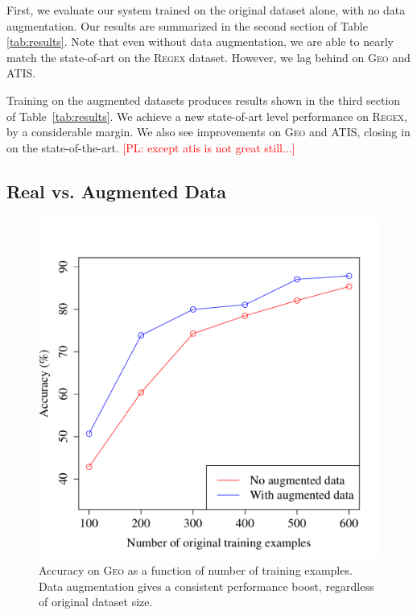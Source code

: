 \documentclass[11pt,letterpaper]{article}
\newcommand{\atis}{\textsc{ATIS}\xspace}
\newcommand{\regex}{\textsc{Regex}\xspace}
\newcommand{\geo}{\textsc{Geo}\xspace}
\newcommand\pl[1]{\textcolor{red}{[PL: #1]}}
\begin{document}
First, we evaluate our system trained on the original dataset alone,
with no data augmentation.
Our results are summarized in the second section of Table \ref{tab:results}.
Note that even without data augmentation, we are able to nearly
match the state-of-art on the \regex dataset.
However, we lag behind on \geo and \atis.

Training on the augmented datasets produces results shown in the
third section of Table~\ref{tab:results}.
We achieve a new state-of-art level performance
on \regex, by a considerable margin.  We also see
improvements on \geo and \atis,
closing in on the state-of-the-art.
\pl{except atis is not great still...}


\subsection{Real vs. Augmented Data}
\begin{figure}[t] 
\small
\begin{center} 
  \includegraphics[scale=0.4]{fig-geo-augment.pdf}
\end{center} 
\caption{Accuracy on \geo as a function of number of training examples.
  Data augmentation gives a consistent performance boost,
regardless of original dataset size.}
\label{fig:geo-augment}
\end{figure}
\end{document}
